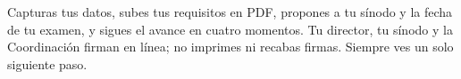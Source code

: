 \documentclass[11pt,a4paper]{article}
\begin{document}
{\small\tableofcontents}
\newpage
\begin{quevasahacer}
Capturas tus datos, subes tus requisitos en PDF, propones a tu sínodo y la fecha de tu examen, y sigues el avance en cuatro momentos. Tu director, tu sínodo y la Coordinación firman en línea; no imprimes ni recabas firmas. Siempre ves un solo siguiente paso.
\end{quevasahacer}





\end{document}
